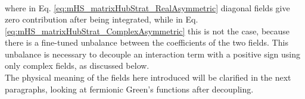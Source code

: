 \documentclass[a4paper,11pt, english]{article}
\makeatletter
\DeclareMathOperator{\tr}{tr}
\theoremstyle{remark}
\newcommand{\nsec}{\vskip 0.8cm}
\newcommand{\vast}{\bBigg@{3}}
\newcommand{\gammabar}{\bar{\gamma}}
\makeatother
\begin{document}
\begin{subequations}
\begin{align}
\end{align}
\end{subequations}

where in Eq. \eqref{eq:mHS_matrixHubStrat_RealAsymmetric} diagonal fields give zero contribution after being integrated, while in Eq. \eqref{eq:mHS_matrixHubStrat_ComplexAsymmetric} this is not the case, because there is a fine-tuned unbalance between the coefficients of the two fields. This unbalance is necessary to decouple an interaction term with a positive sign using only complex fields, as discussed below.\\
The physical meaning of the fields here introduced will be clarified in the next paragraphs, looking at fermionic Green's functions after decoupling.\nsec
\end{document}
